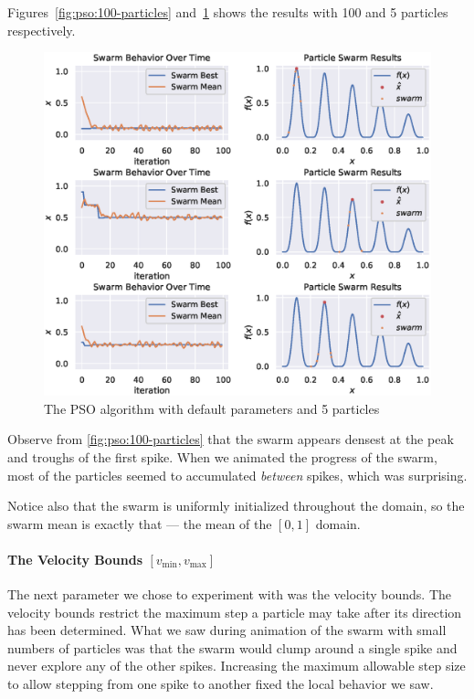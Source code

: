 \documentclass[12pt]{article}
\begin{document}
Figures~\ref{fig:pso:100-particles} and~\ref{fig:pso:5-particles} shows the results with 100 and 5 particles respectively.

\begin{figure}[H]
    \centering
    \includegraphics[width=\textwidth]{figures/pso/pso-5-particles.eps}
    \caption{The PSO algorithm with default parameters and 5 particles}\label{fig:pso:5-particles}
\end{figure}

Observe from \autoref{fig:pso:100-particles} that the swarm appears densest at the peak and troughs of the first spike.
When we animated the progress of the swarm, most of the particles seemed to accumulated \textit{between} spikes, which was surprising.

Notice also that the swarm is uniformly initialized throughout the domain, so the swarm mean is exactly that --- the mean of the $[0, 1]$ domain.

\paragraph{The Velocity Bounds $[v_{\min}, v_{\max}]$} The next parameter we chose to experiment with was the velocity bounds.
The velocity bounds restrict the maximum step a particle may take after its direction has been determined.
What we saw during animation of the swarm with small numbers of particles was that the swarm would clump around a single spike and never explore any of the other spikes.
Increasing the maximum allowable step size to allow stepping from one spike to another fixed the local behavior we saw.
\end{document}
